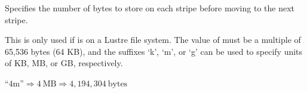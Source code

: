 \begin{nmldescbody}
Specifies the number of bytes to store on each stripe before moving to the
next stripe.

\NOTE
This is only used if 
is on a Lustre file system.
%
The value of \linebreak[4]
must be a multiple of 65,536 bytes (64 KB), and the suffixes
`k', `m', or `g' can be used to specify units of
KB, MB, or GB, respectively.

\EXAMPLE
$\textrm{``4m''} \Rightarrow 4~\textrm{MB}
                 \Rightarrow 4,194,304~\textrm{bytes}$
\end{nmldescbody}


